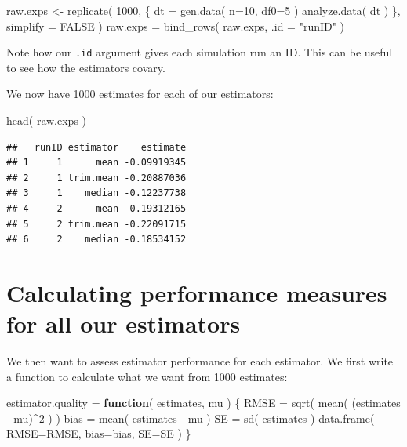 \documentclass[
]{book}
\newenvironment{Shaded}{\begin{snugshade}}{\end{snugshade}}
\newcommand{\AttributeTok}[1]{\textcolor[rgb]{0.77,0.63,0.00}{#1}}
\newcommand{\ConstantTok}[1]{\textcolor[rgb]{0.00,0.00,0.00}{#1}}
\newcommand{\ControlFlowTok}[1]{\textcolor[rgb]{0.13,0.29,0.53}{\textbf{#1}}}
\newcommand{\DecValTok}[1]{\textcolor[rgb]{0.00,0.00,0.81}{#1}}
\newcommand{\FunctionTok}[1]{\textcolor[rgb]{0.00,0.00,0.00}{#1}}
\newcommand{\NormalTok}[1]{#1}
\newcommand{\OtherTok}[1]{\textcolor[rgb]{0.56,0.35,0.01}{#1}}
\newcommand{\SpecialCharTok}[1]{\textcolor[rgb]{0.00,0.00,0.00}{#1}}
\newcommand{\StringTok}[1]{\textcolor[rgb]{0.31,0.60,0.02}{#1}}
\begin{document}
\begin{Shaded}
\begin{Highlighting}[]
\NormalTok{raw.exps }\OtherTok{\textless{}{-}} \FunctionTok{replicate}\NormalTok{( }\DecValTok{1000}\NormalTok{, \{}
\NormalTok{    dt }\OtherTok{=} \FunctionTok{gen.data}\NormalTok{( }\AttributeTok{n=}\DecValTok{10}\NormalTok{, }\AttributeTok{df0=}\DecValTok{5}\NormalTok{ )}
    \FunctionTok{analyze.data}\NormalTok{( dt )}
\NormalTok{\}, }\AttributeTok{simplify =} \ConstantTok{FALSE}\NormalTok{ )}
\NormalTok{raw.exps }\OtherTok{=} \FunctionTok{bind\_rows}\NormalTok{( raw.exps, }\AttributeTok{.id =} \StringTok{"runID"}\NormalTok{ )}
\end{Highlighting}
\end{Shaded}

Note how our \texttt{.id} argument gives each simulation run an ID. This can be
useful to see how the estimators covary.

We now have 1000 estimates for each of our estimators:

\begin{Shaded}
\begin{Highlighting}[]
\FunctionTok{head}\NormalTok{( raw.exps )}
\end{Highlighting}
\end{Shaded}

\begin{verbatim}
##   runID estimator    estimate
## 1     1      mean -0.09919345
## 2     1 trim.mean -0.20887036
## 3     1    median -0.12237738
## 4     2      mean -0.19312165
## 5     2 trim.mean -0.22091715
## 6     2    median -0.18534152
\end{verbatim}

\hypertarget{calculating-performance-measures-for-all-our-estimators}{%
\section{Calculating performance measures for all our estimators}\label{calculating-performance-measures-for-all-our-estimators}}

We then want to assess estimator performance for each estimator.
We first write a function to calculate what we want from 1000 estimates:

\begin{Shaded}
\begin{Highlighting}[]
\NormalTok{estimator.quality }\OtherTok{=} \ControlFlowTok{function}\NormalTok{( estimates, mu ) \{}
\NormalTok{    RMSE }\OtherTok{=} \FunctionTok{sqrt}\NormalTok{( }\FunctionTok{mean}\NormalTok{( (estimates }\SpecialCharTok{{-}}\NormalTok{ mu)}\SpecialCharTok{\^{}}\DecValTok{2}\NormalTok{ ) )}
\NormalTok{    bias }\OtherTok{=} \FunctionTok{mean}\NormalTok{( estimates }\SpecialCharTok{{-}}\NormalTok{ mu )}
\NormalTok{    SE }\OtherTok{=} \FunctionTok{sd}\NormalTok{( estimates )}
    \FunctionTok{data.frame}\NormalTok{( }\AttributeTok{RMSE=}\NormalTok{RMSE, }\AttributeTok{bias=}\NormalTok{bias, }\AttributeTok{SE=}\NormalTok{SE )}
\NormalTok{\}}
\end{Highlighting}
\end{Shaded}
\end{document}
